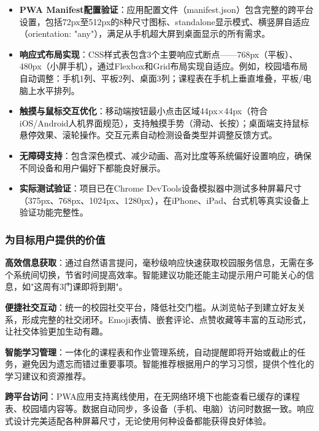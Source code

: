 \documentclass[12pt,a4paper]{article}
\begin{document}
\begin{itemize}
    \item \textbf{PWA Manifest配置验证}：应用配置文件（manifest.json）包含完整的跨平台设置，包括72px至512px的8种尺寸图标、standalone显示模式、横竖屏自适应（orientation: "any"），满足从手机超大屏到桌面显示的所有需求。
    
    \item \textbf{响应式布局实现}：CSS样式表包含3个主要响应式断点——768px（平板）、480px（小屏手机），通过Flexbox和Grid布局实现自适应。例如，校园墙布局自动调整：手机1列、平板2列、桌面3列；课程表在手机上垂直堆叠，平板/电脑上水平排列。
    
    \item \textbf{触摸与鼠标交互优化}：移动端按钮最小点击区域44px×44px（符合iOS/Android人机界面规范），支持触摸手势（滑动、长按）；桌面端支持鼠标悬停效果、滚轮操作。交互元素自动检测设备类型并调整反馈方式。
    
    \item \textbf{无障碍支持}：包含深色模式、减少动画、高对比度等系统偏好设置响应，确保不同设备和用户偏好下都能良好展示。
    
    \item \textbf{实际测试验证}：项目已在Chrome DevTools设备模拟器中测试多种屏幕尺寸（375px、768px、1024px、1280px），在iPhone、iPad、台式机等真实设备上验证功能完整性。
\end{itemize}

\subsubsection{为目标用户提供的价值}

\textbf{高效信息获取}：通过自然语言提问，毫秒级响应快速获取校园服务信息，无需在多个系统间切换，节省时间提高效率。智能建议功能还能主动提示用户可能关心的信息，如"这周有3门课即将到期"。

\textbf{便捷社交互动}：统一的校园社交平台，降低社交门槛。从浏览帖子到建立好友关系，形成完整的社交闭环。Emoji表情、嵌套评论、点赞收藏等丰富的互动形式，让社交体验更加生动有趣。

\textbf{智能学习管理}：一体化的课程表和作业管理系统，自动提醒即将开始或截止的任务，避免因为遗忘而错过重要事项。智能推荐根据用户的学习习惯，提供个性化的学习建议和资源推荐。

\textbf{跨平台访问}：PWA应用支持离线使用，在无网络环境下也能查看已缓存的课程表、校园墙内容等。数据自动同步，多设备（手机、电脑）访问时数据一致。响应式设计完美适配各种屏幕尺寸，无论使用何种设备都能获得良好体验。
\end{document}
